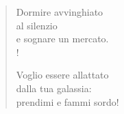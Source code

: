 
\begin{verse}
    Dormire avvinghiato\\
    al silenzio\\
    e sognare un mercato.\\!

    Voglio essere allattato\\
    dalla tua galassia:\\
    prendimi e fammi sordo!
\end{verse}